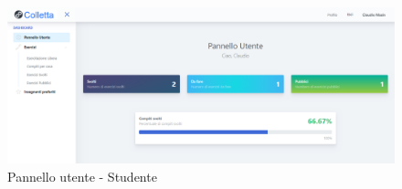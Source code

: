           \begin{figure}[H]
        	\centering
        	\includegraphics[width=1\linewidth]{sez/img/studente/pannello.png} 
        	\caption{Pannello utente - Studente}\label{fig:1}
    	  \end{figure}
               
	\newpage
